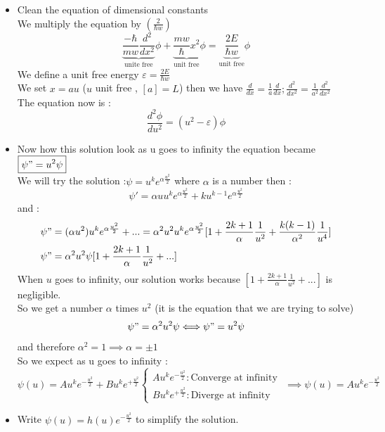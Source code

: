 \documentclass[12pt,oneside]{book}
\begin{document}
\begin{itemize}
	\item Clean the equation of dimensional constants\\
	      We multiply the equation by $(\frac{2}{\hbar w})$
	      \[ \underbrace{\frac{-\hbar}{mw}\frac{d^2}{dx^2}}_\text{unite free}\phi + \underbrace{\frac{mw}{\hbar}x^2}_\text{unit free}\phi = \underbrace{\frac{2E}{\hbar w}}_\text{unit free}\phi  \]
	      We define a unit free energy $\varepsilon = \frac{2E}{\hbar w}$\\
	      We set $x = au$ ($u$ unit free , $[a] = L$) then we have $\frac{d}{dx} = \frac{1}{a}\frac{d}{dx};\frac{d^2}{dx^2} = \frac{1}{a^2}\frac{d^2}{dx^2}$\\
	      The equation now is :
	      \[\frac{d^2\phi}{du^2} = (u^2-\varepsilon)\phi\]
	\item Now how this solution look as u goes to infinity the equation became $\boxed{\psi" = u^2\psi}$\\
	      We will try the solution :$\psi = u^ke^{\alpha \frac{u^2}{2}}$ where $\alpha$ is a number then :
	      \[\psi' = \alpha u u^k e^{\alpha \frac{u^2}{2}} + ku^{k-1}e^{\alpha \frac{u^2}{2}}\]
	      and :
	      \begin{align*}
		      \psi"  & = (\alpha u^2)u^k e^{\alpha \frac{u^2}{2}} + ...  = \alpha^2u^2u^ke^{\alpha\frac{u^2}{2}}[1+ \frac{2k+1}{\alpha}\frac{1}{u^2}+\frac{k(k-1)}{\alpha^2}\frac{1}{u^4}] \\
		      \psi " & = \alpha^2u^2\psi[1+\frac{2k+1}{\alpha}\frac{1}{u^2} + ...]
	      \end{align*}
	      When $u$ goes to infinity, our solution works because $[1+\frac{2k+1}{\alpha}\frac{1}{u^2}+...]$ is negligible.\\
	      So we get a number $\alpha$ times $u^2$ (it is the equation that we are trying to solve)
	      \[ \psi "  = \alpha^2u^2\psi \Longleftrightarrow \psi" = u^2\psi\]
	      and therefore $\alpha^2 = 1\implies \alpha = \pm 1$ \\
	      So we expect as u goes to infinity :\\
	      $\psi(u) = Au^ke^{-\frac{u^2}{2}} + Bu^ke^{+\frac{u^2}{2}}\begin{cases}
			      Au^ke^{-\frac{u^2}{2}} : \text{Converge at infinity } \\
			      Bu^ke^{+\frac{u^2}{2}} : \text{Diverge at infinity}
		      \end{cases} \implies \boxed{\psi(u) = Au^ke^{-\frac{u^2}{2}}}$
	\item Write $\psi(u) = h(u)e^{-\frac{u^2}{2}}$ to simplify the solution.\\

\end{itemize}
\end{document}
